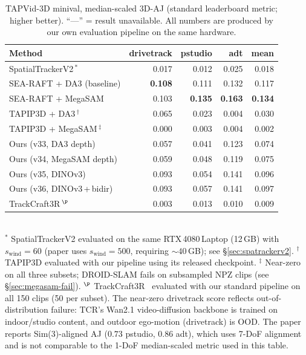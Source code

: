 \documentclass[11pt,a4paper]{article}
\begin{document}
\begin{table}[h]
\centering
\caption{TAPVid-3D minival, median-scaled 3D-AJ (standard leaderboard metric; higher better).
         ``---'' = result unavailable.
         All numbers are produced by our own evaluation pipeline on the same hardware.}
\label{tab:median}
\begin{tabular}{lrrrr}
\toprule
Method & drivetrack & pstudio & adt & mean \\
\midrule
SpatialTrackerV2\,$^{*}$      & 0.017   & 0.012   & 0.025   & 0.018   \\
\midrule
SEA-RAFT + DA3 (baseline)      & \textbf{0.108} & 0.111 & 0.132 & 0.117 \\
SEA-RAFT + MegaSAM             & 0.103 & \textbf{0.135} & \textbf{0.163} & \textbf{0.134} \\
TAPIP3D + DA3\,$^{\dagger}$    & 0.065 & 0.023 & 0.004 & 0.030 \\
TAPIP3D + MegaSAM\,$^{\ddagger}$ & 0.000 & 0.003 & 0.004 & 0.002 \\
Ours (v33, DA3 depth)          & 0.057 & 0.041 & 0.123 & 0.074 \\
Ours (v34, MegaSAM depth)      & 0.059 & 0.048 & 0.119 & 0.075 \\
Ours (v35, DINOv3)             & 0.093 & 0.054 & 0.141 & 0.096 \\
Ours (v36, DINOv3\,+\,bidir)  & 0.093 & 0.057 & 0.141 & 0.097 \\
\midrule
TrackCraft3R\,$^{\P}$          & 0.003 & 0.013 & 0.010 & 0.009 \\
\bottomrule
\end{tabular}
\\[2pt]
{\footnotesize $^{*}$ SpatialTrackerV2 evaluated on the same RTX\,4080\,Laptop (12\,GB) with
$s_{\text{wind}}{=}60$ (paper uses $s_{\text{wind}}{=}500$, requiring ${\sim}40$\,GB); see \S\ref{sec:spatrackerv2}.
$^{\dagger}$ TAPIP3D evaluated with our pipeline using its released checkpoint.
$^{\ddagger}$ Near-zero on all three subsets; DROID-SLAM fails on subsampled NPZ clips (see \S\ref{sec:megasam-fail}).
$^{\P}$ TrackCraft3R~\cite{trackcraft3r} evaluated with our standard pipeline on all 150 clips (50 per subset).
The near-zero drivetrack score reflects out-of-distribution failure: TCR's Wan2.1 video-diffusion backbone
is trained on indoor/studio content, and outdoor ego-motion (drivetrack) is OOD.
The paper reports Sim(3)-aligned AJ ($0.73$ pstudio, $0.86$ adt), which uses 7-DoF alignment and is
not comparable to the 1-DoF median-scaled metric used in this table.}
\end{table}
\end{document}

